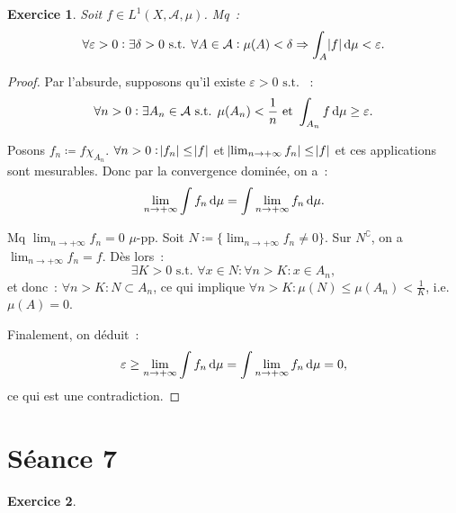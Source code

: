\documentclass{article}
\newtheorem{ex}{Exercice}[section]
\theoremstyle{definition}
\newcommand{\pinfty}{{+\infty}}
\newcommand{\st}{\text{ s.t. }}
\newcommand{\C}{\complement}
\begin{document}
\begin{ex} Soit $f \in L^1(X, \mathcal A, \mu)$. Mq~:
\[\forall \varepsilon > 0 : \exists \delta > 0 \st \forall A \in \mathcal A : \mu(A) < \delta \Rightarrow \int_A\abs f\dif\mu < \varepsilon.\]
\end{ex}

\begin{proof} Par l'absurde, supposons qu'il existe $\varepsilon > 0 \st$~:
\[\forall n > 0 : \exists A_n \in \mathcal A \st \mu(A_n) < \frac 1n \text{ et } \int_{A_n}f\dif \mu \geq \varepsilon.\]

Posons $f_n \coloneqq f\chi_{A_n}$. $\forall n > 0 : \abs {f_n} \leq \abs f$ et $\abs {\lim_{n \to \pinfty}f_n} \leq \abs f$ et ces applications sont mesurables. Donc par
la convergence dominée, on a~:
\[\lim_{n \to \pinfty}\int f_n\dif\mu = \int\lim_{n \to \pinfty}f_n\dif \mu.\]

Mq $\lim_{n \to \pinfty}f_n = 0$ $\mu$-pp. Soit $N \coloneqq \{\lim_{n \to \pinfty}f_n \neq 0\}$. Sur $N^\C$, on a $\lim_{n \to \pinfty}f_n = f$. Dès lors~:
\[\exists K > 0 \st \forall x \in N : \forall n > K : x \in A_n,\]
et donc~: $\forall n > K : N \subset A_n$, ce qui implique $\forall n > K : \mu(N) \leq \mu(A_n) < \frac 1K$, i.e. $\mu(A) = 0$.

Finalement, on déduit~:
\[\varepsilon \geq \lim_{n \to \pinfty}\int f_n\dif \mu = \int\lim_{n \to \pinfty}f_n\dif \mu = 0,\]
ce qui est une contradiction.
\end{proof}

\newpage
\section{Séance 7}
\begin{ex}\label{ex:7.1}
\end{ex}
\end{document}
